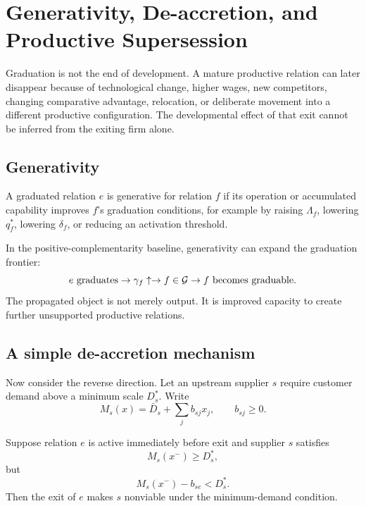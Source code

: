 \section{Generativity, De-accretion, and Productive Supersession}
\label{sec:exit}

Graduation is not the end of development. A mature productive relation can later disappear because of technological change, higher wages, new competitors, changing comparative advantage, relocation, or deliberate movement into a different productive configuration. The developmental effect of that exit cannot be inferred from the exiting firm alone.

\subsection{Generativity}

\begin{definition}[Generativity]
A graduated relation $e$ is generative for relation $f$ if its operation or accumulated capability improves $f$'s graduation conditions, for example by raising $\Lambda_f$, lowering $q_f^*$, lowering $\delta_f$, or reducing an activation threshold.
\end{definition}

In the positive-complementarity baseline, generativity can expand the graduation frontier:
\begin{equation}
e\text{ graduates}
\rightarrow
\gamma_f\uparrow
\rightarrow
f\in\mathcal{G}
\rightarrow
f\text{ becomes graduable}.
\end{equation}
The propagated object is not merely output. It is improved capacity to create further unsupported productive relations.

\subsection{A simple de-accretion mechanism}

Now consider the reverse direction. Let an upstream supplier $s$ require customer demand above a minimum scale $D_s^*$. Write
\begin{equation}
M_s(x)
=
\bar D_s+\sum_j b_{sj}x_j,
\qquad b_{sj}\ge0.
\label{eq:supplier-demand}
\end{equation}

\begin{proposition}
\label{prop:deaccretion}
Suppose relation $e$ is active immediately before exit and supplier $s$ satisfies
\[
M_s(x^- )\ge D_s^*,
\]
but
\[
M_s(x^-)-b_{se}<D_s^*.
\]
Then the exit of $e$ makes $s$ nonviable under the minimum-demand condition.
\end{proposition}

